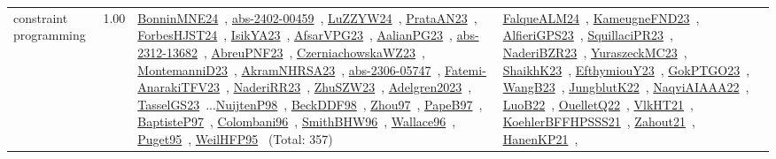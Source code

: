 {\begin{longtable}{p{3cm}r>{\raggedright\arraybackslash}p{6cm}>{\raggedright\arraybackslash}p{6cm}>{\raggedright\arraybackslash}p{8cm}}
\index{constraint programming}\index{CP!constraint programming}constraint programming &  1.00 & \href{../works/BonninMNE24.pdf}{BonninMNE24}~\cite{BonninMNE24}, \href{../works/abs-2402-00459.pdf}{abs-2402-00459}~\cite{abs-2402-00459}, \href{../works/LuZZYW24.pdf}{LuZZYW24}~\cite{LuZZYW24}, \href{../works/PrataAN23.pdf}{PrataAN23}~\cite{PrataAN23}, \href{../works/ForbesHJST24.pdf}{ForbesHJST24}~\cite{ForbesHJST24}, \href{../works/IsikYA23.pdf}{IsikYA23}~\cite{IsikYA23}, \href{../works/AfsarVPG23.pdf}{AfsarVPG23}~\cite{AfsarVPG23}, \href{../works/AalianPG23.pdf}{AalianPG23}~\cite{AalianPG23}, \href{../works/abs-2312-13682.pdf}{abs-2312-13682}~\cite{abs-2312-13682}, \href{../works/AbreuPNF23.pdf}{AbreuPNF23}~\cite{AbreuPNF23}, \href{../works/CzerniachowskaWZ23.pdf}{CzerniachowskaWZ23}~\cite{CzerniachowskaWZ23}, \href{../works/MontemanniD23.pdf}{MontemanniD23}~\cite{MontemanniD23}, \href{../works/AkramNHRSA23.pdf}{AkramNHRSA23}~\cite{AkramNHRSA23}, \href{../works/abs-2306-05747.pdf}{abs-2306-05747}~\cite{abs-2306-05747}, \href{../works/Fatemi-AnarakiTFV23.pdf}{Fatemi-AnarakiTFV23}~\cite{Fatemi-AnarakiTFV23}, \href{../works/NaderiRR23.pdf}{NaderiRR23}~\cite{NaderiRR23}, \href{../works/ZhuSZW23.pdf}{ZhuSZW23}~\cite{ZhuSZW23}, \href{../works/Adelgren2023.pdf}{Adelgren2023}~\cite{Adelgren2023}, \href{../works/TasselGS23.pdf}{TasselGS23}~\cite{TasselGS23}...\href{../works/NuijtenP98.pdf}{NuijtenP98}~\cite{NuijtenP98}, \href{../works/BeckDDF98.pdf}{BeckDDF98}~\cite{BeckDDF98}, \href{../works/Zhou97.pdf}{Zhou97}~\cite{Zhou97}, \href{../works/PapeB97.pdf}{PapeB97}~\cite{PapeB97}, \href{../works/BaptisteP97.pdf}{BaptisteP97}~\cite{BaptisteP97}, \href{../works/Colombani96.pdf}{Colombani96}~\cite{Colombani96}, \href{../works/SmithBHW96.pdf}{SmithBHW96}~\cite{SmithBHW96}, \href{../works/Wallace96.pdf}{Wallace96}~\cite{Wallace96}, \href{../works/Puget95.pdf}{Puget95}~\cite{Puget95}, \href{../works/WeilHFP95.pdf}{WeilHFP95}~\cite{WeilHFP95} (Total: 357) & \href{../works/FalqueALM24.pdf}{FalqueALM24}~\cite{FalqueALM24}, \href{../works/KameugneFND23.pdf}{KameugneFND23}~\cite{KameugneFND23}, \href{../works/AlfieriGPS23.pdf}{AlfieriGPS23}~\cite{AlfieriGPS23}, \href{../works/SquillaciPR23.pdf}{SquillaciPR23}~\cite{SquillaciPR23}, \href{../works/NaderiBZR23.pdf}{NaderiBZR23}~\cite{NaderiBZR23}, \href{../works/YuraszeckMC23.pdf}{YuraszeckMC23}~\cite{YuraszeckMC23}, \href{../works/ShaikhK23.pdf}{ShaikhK23}~\cite{ShaikhK23}, \href{../works/EfthymiouY23.pdf}{EfthymiouY23}~\cite{EfthymiouY23}, \href{../works/GokPTGO23.pdf}{GokPTGO23}~\cite{GokPTGO23}, \href{../works/WangB23.pdf}{WangB23}~\cite{WangB23}, \href{../works/JungblutK22.pdf}{JungblutK22}~\cite{JungblutK22}, \href{../works/NaqviAIAAA22.pdf}{NaqviAIAAA22}~\cite{NaqviAIAAA22}, \href{../works/LuoB22.pdf}{LuoB22}~\cite{LuoB22}, \href{../works/OuelletQ22.pdf}{OuelletQ22}~\cite{OuelletQ22}, \href{../works/VlkHT21.pdf}{VlkHT21}~\cite{VlkHT21}, \href{../works/KoehlerBFFHPSSS21.pdf}{KoehlerBFFHPSSS21}~\cite{KoehlerBFFHPSSS21}, \href{../works/Zahout21.pdf}{Zahout21}~\cite{Zahout21}, \href{../works/HanenKP21.pdf}{HanenKP21}~\cite{HanenKP21}, 
\end{longtable}}
